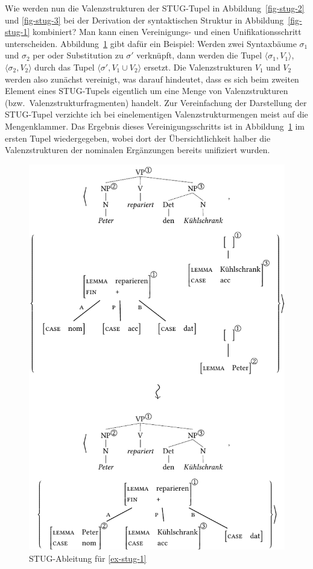 Wie werden nun die Valenzstrukturen der STUG-Tupel in Abbildung~\ref{fig-stug-2} und \ref{fig-stug-3} bei der Derivation der syntaktischen Struktur in Abbildung~\ref{fig-stug-1} kombiniert? Man kann einen Vereini\-gungs- und einen Unifikationsschritt unterscheiden. Abbildung~\ref{fig-stug-4} gibt dafür ein Beispiel: Werden zwei Syntaxbäume $\sigma_1$ und $\sigma_2$ per  oder Substitution zu $\sigma'$ verknüpft, dann werden die Tupel $\langle \sigma_1, V_1 \rangle$, $\langle \sigma_2, V_2 \rangle$ durch das Tupel $\langle \sigma', V_1 \cup V_2 \rangle$ ersetzt. Die Valenzstrukturen $V_1$ und $V_2$ werden also zunächst vereinigt, was darauf hindeutet, dass es sich beim zweiten Element eines STUG-Tupels eigentlich um eine Menge von Valenzstrukturen (bzw.\ Valenzstrukturfragmenten) handelt. Zur Vereinfachung der Darstellung der STUG-Tupel verzichte ich bei einelementigen Valenzstrukturmengen meist auf die Mengenklammer. Das Ergebnis dieses Vereinigungsschritts ist in Abbildung~\ref{fig-stug-4} im ersten Tupel wiedergegeben, wobei dort der Übersichtlichkeit halber die Valenzstrukturen der nominalen Ergänzungen bereits unifiziert wurden.
\begin{figure}[t]
\centering
\includegraphics{graphics/abb94.pdf}
\caption{\label{fig-stug-4}STUG-Ableitung für \ref{ex-stug-1}}
\end{figure}

